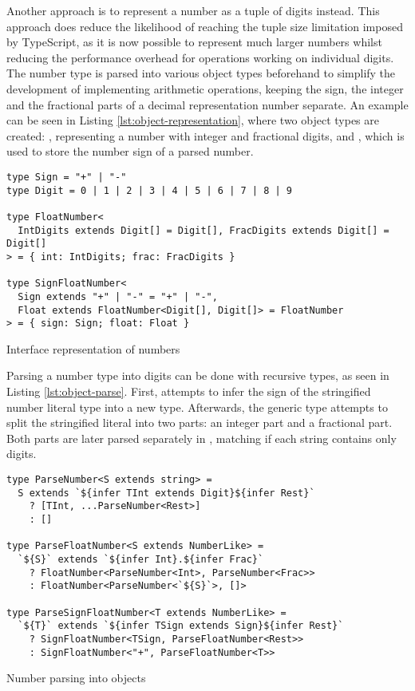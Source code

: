 \clearpage

Another approach is to represent a number as a tuple of digits instead. This approach does reduce the likelihood of reaching the tuple size limitation imposed by TypeScript, as it is now possible to represent much larger numbers whilst reducing the performance overhead for operations working on individual digits. The number type is parsed into various object types beforehand to simplify the development of implementing arithmetic operations, keeping the sign, the integer and the fractional parts of a decimal representation number separate. An example can be seen in Listing \ref{lst:object-representation}, where two object types are created: , representing a number with integer and fractional digits, and , which is used to store the number sign of a parsed number.

\begin{listing}[ht]
  \begin{verbatim}
type Sign = "+" | "-"
type Digit = 0 | 1 | 2 | 3 | 4 | 5 | 6 | 7 | 8 | 9

type FloatNumber<
  IntDigits extends Digit[] = Digit[], FracDigits extends Digit[] = Digit[]
> = { int: IntDigits; frac: FracDigits }

type SignFloatNumber<
  Sign extends "+" | "-" = "+" | "-",
  Float extends FloatNumber<Digit[], Digit[]> = FloatNumber
> = { sign: Sign; float: Float }
\end{verbatim}
  \caption{Interface representation of numbers}\label{lst:object-representation}
\end{listing}

Parsing a number type into digits can be done with recursive types, as seen in Listing \ref{lst:object-parse}. First,  attempts to infer the sign of the stringified number literal type into a new  type. Afterwards, the  generic type attempts to split the stringified literal into two parts: an integer part and a fractional part. Both parts are later parsed separately in , matching if each string contains only digits.

\begin{listing}[ht]
  \begin{verbatim}
type ParseNumber<S extends string> =
  S extends `${infer TInt extends Digit}${infer Rest}`
    ? [TInt, ...ParseNumber<Rest>]
    : []

type ParseFloatNumber<S extends NumberLike> =
  `${S}` extends `${infer Int}.${infer Frac}`
    ? FloatNumber<ParseNumber<Int>, ParseNumber<Frac>>
    : FloatNumber<ParseNumber<`${S}`>, []>

type ParseSignFloatNumber<T extends NumberLike> =
  `${T}` extends `${infer TSign extends Sign}${infer Rest}`
    ? SignFloatNumber<TSign, ParseFloatNumber<Rest>>
    : SignFloatNumber<"+", ParseFloatNumber<T>>
\end{verbatim}
  \caption{Number parsing into objects}\label{lst:object-parse}
\end{listing}

